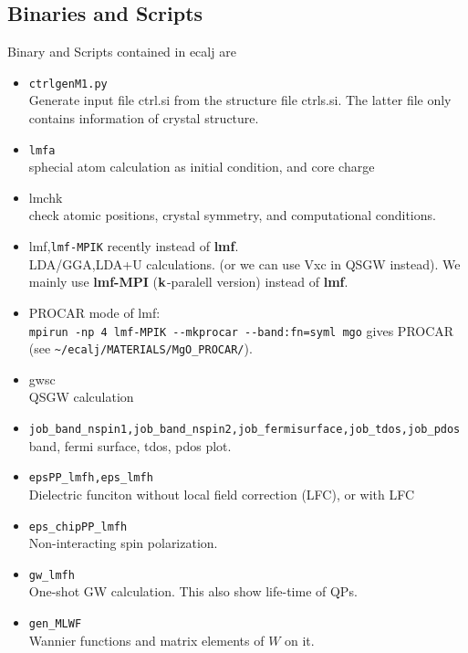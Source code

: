 \documentclass[a4paper,10pt,epsf,fleqn]{article}
\newcommand{\bfk}{{\bf k}}
\newcommand{\exe}[1]{{\bf #1}}
\newcommand{\io}[1]{{\sf  #1}}
\begin{document}
\subsection{Binaries and Scripts}
Binary and Scripts contained in \io{ecalj} are
\begin{itemize}
\item {\tt ctrlgenM1.py}\\
  Generate input file \io{ctrl.si} from the structure file
  \io{ctrls.si}. The latter file only contains information of crystal structure.
\item {\tt lmfa}\\
  sphecial atom calculation as initial condition, and core charge 
\item \io{lmchk}\\
  check atomic positions, crystal symmetry, and computational conditions.
\item lmf,\verb#lmf-MPIK# recently instead of \exe{lmf}.\\
  LDA/GGA,LDA+U calculations. (or we can use Vxc in QSGW instead).
  We mainly use \exe{lmf-MPI} ($\bfk$-paralell version) instead of \exe{lmf}.
\item 
  PROCAR mode of lmf:\\
  \verb#mpirun -np 4 lmf-MPIK --mkprocar --band:fn=syml mgo# gives PROCAR \\
   (see \verb#~/ecalj/MATERIALS/MgO_PROCAR/#).
\item \io{gwsc}\\
QSGW calculation
\item \verb#job_band_nspin1,job_band_nspin2,job_fermisurface,job_tdos,job_pdos#\\
band, fermi surface, tdos, pdos plot.
\item \verb#epsPP_lmfh,eps_lmfh#\\
Dielectric funciton without local field correction (LFC), or with LFC
\item \verb#eps_chipPP_lmfh#\\
Non-interacting spin polarization.
\item \verb#gw_lmfh#\\ One-shot GW calculation. This also show life-time of QPs.
\item \verb#gen_MLWF#\\ Wannier functions and matrix elements of $W$ on it.
\end{itemize}
\end{document}
